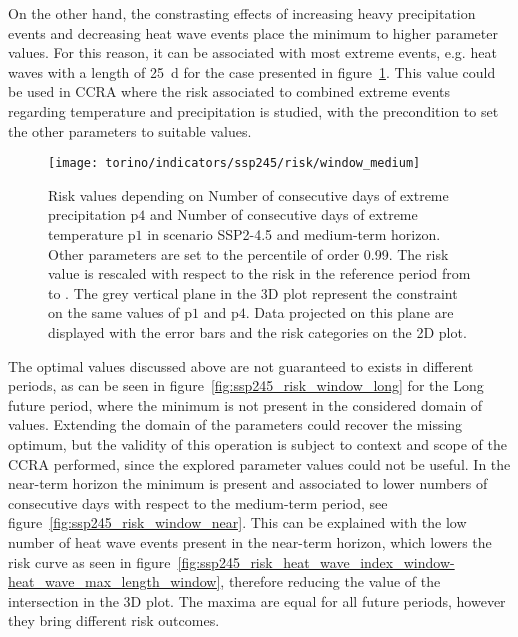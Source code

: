 On the other hand, the constrasting effects of increasing heavy precipitation events and decreasing heat wave events place the minimum to higher parameter values. For this reason, it can be associated with most extreme events, e.g. heat waves with a length of \qty{25}{\day} for the case presented in figure~\ref{fig:ssp245_risk_window_medium}.
This value could be used in \gls{CCRA} where the risk associated to combined extreme events regarding temperature and precipitation is studied, with the precondition to set the other parameters to suitable values.

\begin{figure}
  \centering
  \texttt{[image: torino/indicators/ssp245/risk/window\_medium]}
  \caption{Risk values depending on {Number of consecutive days of extreme precipitation} $\mathrm{p4}$ and {Number of consecutive days of extreme temperature} $\mathrm{p1}$ in scenario SSP2-4.5 and medium-term horizon. Other parameters are set to the percentile of order 0.99. The risk value is rescaled with respect to the risk in the reference period from  to . The grey vertical plane in the 3D plot represent the constraint on the same values of $\mathrm{p1}$ and $\mathrm{p4}$. Data projected on this plane are displayed with the error bars and the risk categories on the 2D plot.}
  \label{fig:ssp245_risk_window_medium}
\end{figure}

The optimal values discussed above are not guaranteed to exists in different periods, as can be seen in figure~\ref{fig:ssp245_risk_window_long} for the Long future period, where the minimum is not present in the considered domain of values. Extending the domain of the parameters could recover the missing optimum, but the validity of this operation is subject to context and scope of the \gls{CCRA} performed, since the explored parameter values could not be useful.
In the near-term horizon the minimum is present and associated to lower numbers of consecutive days with respect to the medium-term period, see figure~\ref{fig:ssp245_risk_window_near}. This can be explained with the low number of heat wave events present in the near-term horizon, which lowers the risk curve as seen in figure~\ref{fig:ssp245_risk_heat_wave_index_window-heat_wave_max_length_window}, therefore reducing the value of the intersection in the 3D plot.
The maxima are equal for all future periods, however they bring different risk outcomes.

